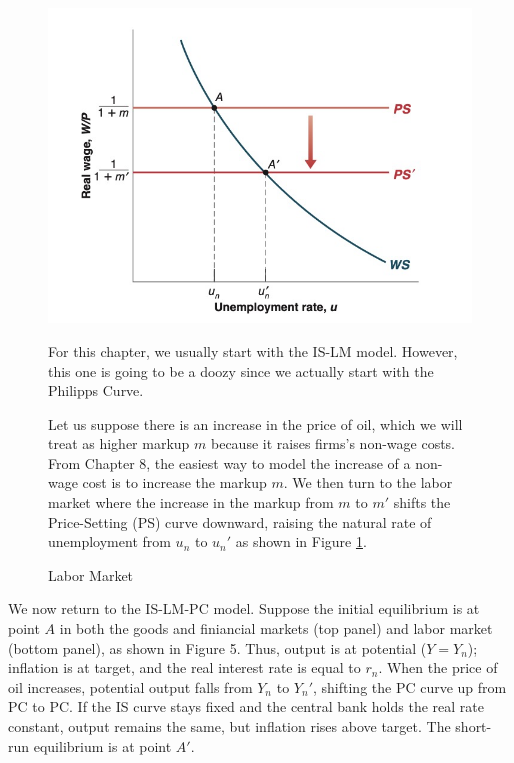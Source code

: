 \documentclass{extarticle}
\begin{document}
\begin{figure}[H] 
  \centering %
  \begin{minipage}{0.35\linewidth} 
    \centering 
    \includegraphics[width=\linewidth]{labor.png} 
    \caption{Labor Market} 
    \label{fig:labor} 
  \end{minipage}%
  \begin{minipage}{0.65\linewidth}
    For this chapter, we usually start with the IS-LM model. However, this one is going to be a doozy since we actually start with the Philipps Curve. 
    
    \vspace{2mm}
    
    Let us suppose there is an increase in the price of oil, which we will treat as higher markup $m$ because it raises firms’s non-wage costs. 
    From Chapter 8, the easiest way to model the increase of a non-wage cost is to increase the markup $m$. 
    We then turn to the labor market where the increase in the markup from $m$ to $m'$ shifts the Price-Setting (PS) curve downward, raising the natural rate of unemployment from $u_n$ to $u_n'$ as shown in Figure \ref{fig:labor}. 
  \end{minipage} 
\end{figure}


We now return to the IS-LM-PC model. Suppose the initial equilibrium is at point $A$ in both the goods and finiancial markets (top panel) and labor market (bottom panel), as shown in Figure 5. 
Thus, output is at potential ($Y = Y_n$); inflation is at target, and the real interest rate is equal to $r_n$. When the price of oil increases, potential output falls from $Y_n$ to $Y_n'$, shifting the PC curve up from PC to PC. 
If the IS curve stays fixed and the central bank holds the real rate constant, output remains the same, but inflation rises above target. The short-run equilibrium is at point $A'$.
\end{document}
